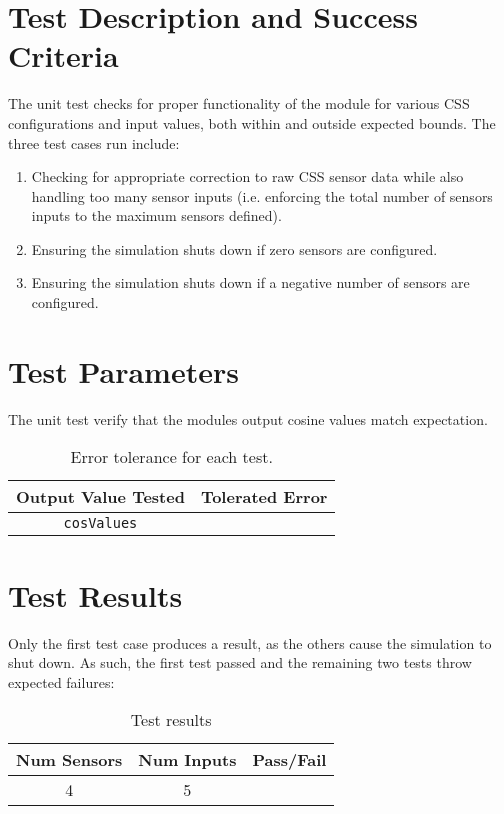 
\section{Test Description and Success Criteria}
The unit test checks for proper functionality of the module for various CSS configurations and input values, both within and outside expected bounds. The three test cases run include:
\begin{enumerate}
\item Checking for appropriate correction to raw CSS sensor data while also handling too many sensor inputs (i.e. enforcing the total number of sensors inputs to the maximum sensors defined).
\item Ensuring the simulation shuts down if zero sensors are configured.
\item Ensuring the simulation shuts down if a negative number of sensors are configured.
\end{enumerate}


\section{Test Parameters}

The unit test verify that the modules output cosine values match expectation.
\begin{table}[htbp]
	\caption{Error tolerance for each test.}
	\label{tab:errortol}
	\centering \fontsize{10}{10}\selectfont
	\begin{tabular}{ c | c } %
		\hline\hline
		\textbf{Output Value Tested}  & \textbf{Tolerated Error}  \\ 
		\hline
		{\tt cosValues}        & 	   \\ 
		\hline\hline
	\end{tabular}
\end{table}




\section{Test Results}

Only the first test case produces a result, as the others cause the simulation to shut down. As such, the first test passed and the remaining two tests throw expected failures:
\begin{table}[H]
	\caption{Test results}
	\label{tab:results}
	\centering \fontsize{10}{10}\selectfont
	\begin{tabular}{c | c | c  } %
		\hline\hline
		\textbf{Num Sensors} 		& \textbf{Num Inputs}				  		&\textbf{Pass/Fail} \\ 
		\hline
	   4	   			& 5 & \\ 
	   \hline\hline
	\end{tabular}
\end{table}








